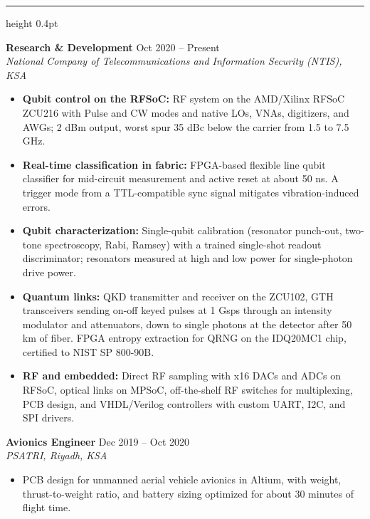 \documentclass[a4paper,10pt]{article}
\newcommand{\divider}{\par\vspace{2.2mm}\hrule height 0.4pt\vspace{1.6mm}\par\noindent}
\begin{document}
\divider
\noindent
\textbf{Research \& Development} \hfill Oct 2020 – Present\\
\textit{National Company of Telecommunications and Information Security (NTIS), KSA}
\begin{itemize}[left=0pt, label={--}]
    \item \textbf{Qubit control on the RFSoC:} RF system on the AMD/Xilinx RFSoC ZCU216 with Pulse and CW modes and native LOs, VNAs, digitizers, and AWGs; 2 dBm output, worst spur 35 dBc below the carrier from 1.5 to 7.5 GHz.
    \item \textbf{Real-time classification in fabric:} FPGA-based flexible line qubit classifier for mid-circuit measurement and active reset at about 50 ns. A trigger mode from a TTL-compatible sync signal mitigates vibration-induced errors.
    \item \textbf{Qubit characterization:} Single-qubit calibration (resonator punch-out, two-tone spectroscopy, Rabi, Ramsey) with a trained single-shot readout discriminator; resonators measured at high and low power for single-photon drive power.
    \item \textbf{Quantum links:} QKD transmitter and receiver on the ZCU102, GTH transceivers sending on-off keyed pulses at 1 Gsps through an intensity modulator and attenuators, down to single photons at the detector after 50 km of fiber. FPGA entropy extraction for QRNG on the IDQ20MC1 chip, certified to NIST SP 800-90B.
    \item \textbf{RF and embedded:} Direct RF sampling with x16 DACs and ADCs on RFSoC, optical links on MPSoC, off-the-shelf RF switches for multiplexing, PCB design, and VHDL/Verilog controllers with custom UART, I2C, and SPI drivers.
\end{itemize}


\vspace{0.7mm}
\textbf{Avionics Engineer} \hfill Dec 2019 – Oct 2020\\
\textit{PSATRI, Riyadh, KSA}
\begin{itemize}[left=0pt, label={--}]
    \item PCB design for unmanned aerial vehicle avionics in Altium, with weight, thrust-to-weight ratio, and battery sizing optimized for about 30 minutes of flight time.
\end{itemize}
\end{document}
